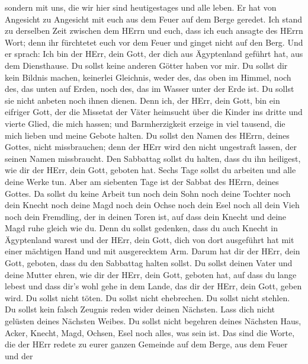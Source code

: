 sondern mit uns, die wir hier sind heutigestages und alle leben.
 Er hat von Angesicht zu Angesicht mit euch aus dem Feuer
auf dem Berge geredet.  Ich stand zu derselben Zeit zwischen
dem HErrn und euch, dass ich euch ansagte des HErrn Wort; denn ihr
fürchtetet euch vor dem Feuer und ginget nicht auf den Berg. Und er
sprach:  Ich bin der HErr, dein Gott, der dich aus
Ägyptenland geführt hat, aus dem Diensthause.  Du sollst
keine anderen Götter haben vor mir.  Du sollst dir kein
Bildnis machen, keinerlei Gleichnis, weder des, das oben im Himmel, noch
des, das unten auf Erden, noch des, das im Wasser unter der Erde ist.
 Du sollst sie nicht anbeten noch ihnen dienen. Denn ich,
der HErr, dein Gott, bin ein eifriger Gott, der die Missetat der Väter
heimsucht über die Kinder ins dritte und vierte Glied, die mich hassen;
 und Barmherzigkeit erzeige in viel tausend, die mich
lieben und meine Gebote halten.  Du sollst den Namen des
HErrn, deines Gottes, nicht missbrauchen; denn der HErr wird den nicht
ungestraft lassen, der seinen Namen missbraucht.  Den
Sabbattag sollst du halten, dass du ihn heiligest, wie dir der HErr,
dein Gott, geboten hat.  Sechs Tage sollst du arbeiten und
alle deine Werke tun.  Aber am siebenten Tage ist der
Sabbat des HErrn, deines Gottes. Da sollst du keine Arbeit tun noch dein
Sohn noch deine Tochter noch dein Knecht noch deine Magd noch dein Ochse
noch dein Esel noch all dein Vieh noch dein Fremdling, der in deinen
Toren ist, auf dass dein Knecht und deine Magd ruhe gleich wie du.
 Denn du sollst gedenken, dass du auch Knecht in
Ägyptenland warest und der HErr, dein Gott, dich von dort ausgeführt hat
mit einer mächtigen Hand und mit ausgerecktem Arm. Darum hat dir der
HErr, dein Gott, geboten, dass du den Sabbattag halten sollst.
 Du sollst deinen Vater und deine Mutter ehren, wie dir der
HErr, dein Gott, geboten hat, auf dass du lange lebest und dass dir's
wohl gehe in dem Lande, das dir der HErr, dein Gott, geben wird.
 Du sollst nicht töten.  Du sollst nicht
ehebrechen.  Du sollst nicht stehlen.  Du
sollst kein falsch Zeugnis reden wider deinen Nächsten. 
Lass dich nicht gelüsten deines Nächsten Weibes. Du sollst nicht
begehren deines Nächsten Haus, Acker, Knecht, Magd, Ochsen, Esel noch
alles, was sein ist.  Das sind die Worte, die der HErr
redete zu eurer ganzen Gemeinde auf dem Berge, aus dem Feuer und der
